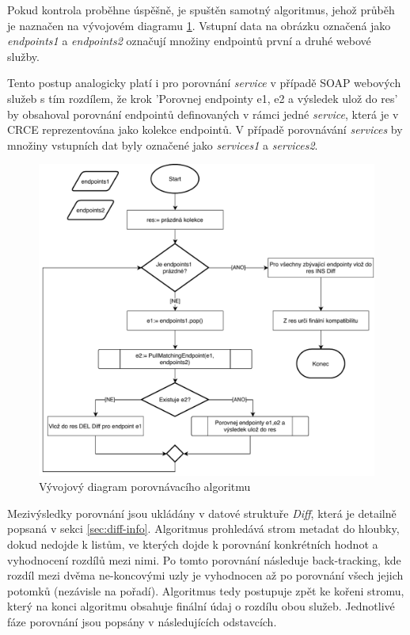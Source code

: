 \documentclass[czech,DP]{thesiskiv}
\begin{document}
Pokud kontrola proběhne úspěšně, je spuštěn samotný algoritmus, jehož průběh je naznačen na vývojovém diagramu \ref{fig:apicomp-flow}. Vstupní data na obrázku označená jako \textit{endpoints1} a \textit{endpoints2} označují množiny endpointů první a druhé webové služby. 

Tento postup analogicky platí i pro porovnání \textit{service} v případě SOAP webových služeb s tím rozdílem, že krok 'Porovnej endpointy e1, e2 a výsledek ulož do res' by obsahoval porovnání endpointů definovaných v rámci jedné \textit{service}, která je v CRCE reprezentována jako kolekce endpointů. V případě porovnávání \textit{services} by množiny vstupních dat byly označené jako \textit{services1} a \textit{services2}.

\begin{figure}[h]
	\centering
	\includegraphics[width=\linewidth]{apicomp-flow}
	\caption{Vývojový diagram porovnávacího algoritmu}
	\label{fig:apicomp-flow}
\end{figure}

Mezivýsledky porovnání jsou ukládány v datové struktuře \textit{Diff}, která je detailně popsaná v sekci \ref{sec:diff-info}. Algoritmus prohledává strom metadat do hloubky, dokud nedojde k listům, ve kterých dojde k porovnání konkrétních hodnot a vyhodnocení rozdílů mezi nimi. Po tomto porovnání následuje back-tracking, kde rozdíl mezi dvěma ne-koncovými uzly je vyhodnocen až po porovnání všech jejich potomků (nezávisle na pořadí). Algoritmus tedy postupuje zpět ke kořeni stromu, který na konci algoritmu obsahuje finální údaj o rozdílu obou služeb. Jednotlivé fáze porovnání jsou popsány v následujících odstavcích.
\end{document}

